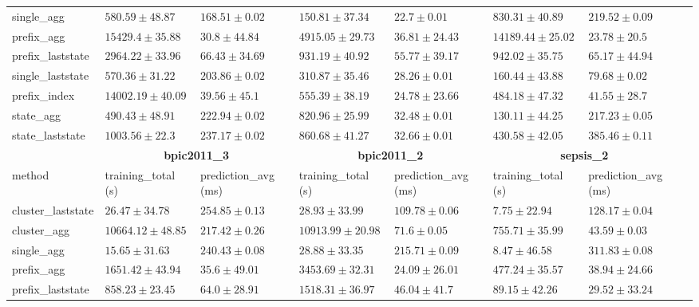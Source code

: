 \documentclass[twoside,11pt]{Latex/Classes/PhDthesisPSnPDF}
\begin{document}
\begin{table}[h]
{\begin{tabular}{llllllll}
				single\_agg & $580.59 \pm 48.87$ & $168.51 \pm 0.02$ & $\mathbf{150.81 \pm 37.34}$ & $22.7 \pm 0.01$ & $830.31 \pm 40.89$ & $219.52 \pm 0.09$ \\ 
				prefix\_agg & $15429.4 \pm 35.88$ & $\mathbf{30.8 \pm 44.84}$ & $4915.05 \pm 29.73$ & $36.81 \pm 24.43$ & $14189.44 \pm 25.02$ & $\mathbf{23.78 \pm 20.5}$ \\ 
				prefix\_laststate & $2964.22 \pm 33.96$ & $66.43 \pm 34.69$ & $931.19 \pm 40.92$ & $55.77 \pm 39.17$ & $942.02 \pm 35.75$ & $65.17 \pm 44.94$ \\ 
				single\_laststate & $570.36 \pm 31.22$ & $203.86 \pm 0.02$ & $310.87 \pm 35.46$ & $28.26 \pm 0.01$ & $160.44 \pm 43.88$ & $79.68 \pm 0.02$ \\ 
				prefix\_index & $14002.19 \pm 40.09$ & $39.56 \pm 45.1$ & $555.39 \pm 38.19$ & $24.78 \pm 23.66$ & $484.18 \pm 47.32$ & $41.55 \pm 28.7$ \\ 
				state\_agg & $\mathbf{490.43 \pm 48.91}$ & $222.94 \pm 0.02$ & $820.96 \pm 25.99$ & $32.48 \pm 0.01$ & $\mathbf{130.11 \pm 44.25}$ & $217.23 \pm 0.05$ \\ 
				state\_laststate & $1003.56 \pm 22.3$ & $237.17 \pm 0.02$ & $860.68 \pm 41.27$ & $32.66 \pm 0.01$ & $430.58 \pm 42.05$ & $385.46 \pm 0.11$ \\ 
				\bottomrule
				\toprule
				& \multicolumn{2}{c}{{\bfseries bpic2011\_3}} & \multicolumn{2}{c}{{\bfseries bpic2011\_2}} & \multicolumn{2}{c}{{\bfseries sepsis\_2}} \\ \cmidrule(lr){2-3} \cmidrule(lr){4-5} \cmidrule(lr){6-7}
				method  & training\_total (s) & prediction\_avg (ms) & training\_total (s) & prediction\_avg (ms) & training\_total (s) & prediction\_avg (ms) \\ \midrule
				cluster\_laststate & $26.47 \pm 34.78$ & $254.85 \pm 0.13$ & $28.93 \pm 33.99$ & $109.78 \pm 0.06$ & $7.75 \pm 22.94$ & $128.17 \pm 0.04$ \\ 
				cluster\_agg & $10664.12 \pm 48.85$ & $217.42 \pm 0.26$ & $10913.99 \pm 20.98$ & $71.6 \pm 0.05$ & $755.71 \pm 35.99$ & $43.59 \pm 0.03$ \\ 
				single\_agg & $15.65 \pm 31.63$ & $240.43 \pm 0.08$ & $28.88 \pm 33.35$ & $215.71 \pm 0.09$ & $8.47 \pm 46.58$ & $311.83 \pm 0.08$ \\ 
				prefix\_agg & $1651.42 \pm 43.94$ & $\mathbf{35.6 \pm 49.01}$ & $3453.69 \pm 32.31$ & $\mathbf{24.09 \pm 26.01}$ & $477.24 \pm 35.57$ & $38.94 \pm 24.66$ \\ 
				prefix\_laststate & $858.23 \pm 23.45$ & $64.0 \pm 28.91$ & $1518.31 \pm 36.97$ & $46.04 \pm 41.7$ & $89.15 \pm 42.26$ & $\mathbf{29.52 \pm 33.24}$ \\ 

\end{tabular}}
\end{table}
\end{document}
